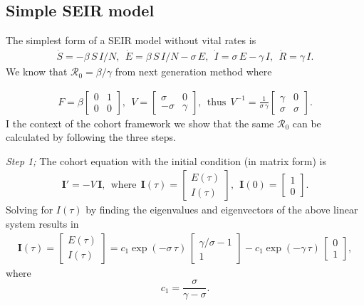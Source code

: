 \documentclass[12pt]{article}
\DeclareRobustCommand\_{\ifmmode\expandafter\subtxt\else\textunderscore\fi}
\newcommand{\R}{\ensuremath{\mathcal{R}_0}}
\renewcommand{\vec}[1]{\ensuremath{\mathbf{#1}}} %
\theoremstyle{definition} %
\begin{document}
\subsection{Simple SEIR model}
The simplest form of a SEIR model without vital rates is 
\begin{align}\label{mo:sier1}
\dot S=-\beta\,S\,I/N,~~
\dot E= \beta\,S\,I/N -\sigma\,E,~~
\dot I= \sigma\,E -\gamma\,I,~~
\dot R= \gamma\,I.
\end{align}
We know that $\R=\beta/\gamma$ from next generation method where 

\begin{align}
\label{seir1FV}
F = \beta \left[ \begin {array}{cc} 
0 & 1 \\
0 & 0
 \end {array} \right],~~
V=
 \left[ \begin {array}{cc}
 \sigma & 0 \\
-\sigma & \gamma
\end {array} \right],
~~ \text{thus}~~
V^{-1} = \frac{1}{\sigma\,\gamma}
\left[ \begin {array}{cc}
\gamma & 0 \\
\sigma & \sigma
\end {array} \right].
\end{align}
I the context of the cohort framework we show that the same $\R$ can be calculated by following the three steps.

{\it Step 1;} The cohort equation with the initial condition (in matrix form) is 
\begin{align}
\vec I'=-V\,\vec I,~~ \text{where}~~ \vec I(\tau)=\left[ \begin {array}{c} E(\tau)\\I(\tau) \end {array} \right], ~~
\vec I(0)=\left[ \begin {array}{c} 1\\0 \end {array} \right].
\end{align}
Solving for $I(\tau)$ by finding the eigenvalues and eigenvectors of the above linear system results in
\begin{align}
\vec I(\tau) = \left[ \begin {array}{c} E(\tau)\\I(\tau) \end {array} \right] =
c_1 \exp(-\sigma\,\tau)\,\left[ \begin {array}{c} \gamma/\sigma-1\\1 \end {array} \right] 
-c_1 \exp(-\gamma\,\tau)\,\left[ \begin {array}{c} 0\\1 \end {array} \right],
\end{align}
where $$c_1=\frac{\sigma}{\gamma-\sigma}.$$
\end{document}
